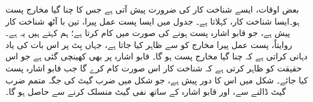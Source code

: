 بعض اوقات، ایسے شناخت کار کی ضرورت پیش آتی ہے جس کا چنا گیا مخارج پست ہو۔ایسا شناخت کار، کہلاتا ہے۔ جدول  میں ایسا پست عمل پیرا، تین با آٹھ شناخت کار پیش ہے، جو قابو اشارہ  پست ہونے کی صورت میں کام کرتا ہے؛ ہم کہتے ہیں یہ  ہے۔ روایتاً، پست عمل پیرا مخارج کو  سے ظاہر کیا جاتا ہے، جہاں بِٹ پر  اس بات کی یاد دہانی کراتی ہے کہ چنا گیا مخارج پست ہو گا۔ قابو اشارہ پر بھی  کھینچی گئی ہے  جو اس حقیقت کو ظاہر کرتی ہے کہ شناخت کار اس صورت کام کرے گا جب قابو اشارہ پست کیا جائے۔ شکل  میں اس کا دور پیش ہے، جو 
شکل  میں ضرب گیٹ کی جگہ متمم ضرب گیٹ ڈالنے سے، اور قابو اشارہ کے ساتھ نفی گیٹ منسلک کرنے سے حاصل ہو گا۔
 
